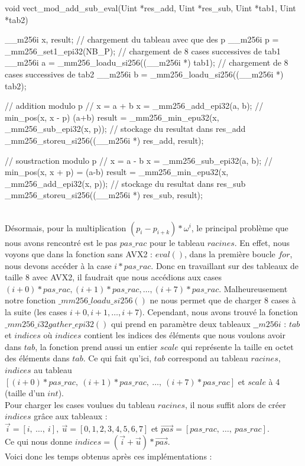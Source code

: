\documentclass[12pt, a4paper]{article}
\begin{document}
\begin{customFrame}
void vect_mod_add_sub_eval(Uint *res_add, Uint *res_sub, Uint *tab1, Uint *tab2) {
    __m256i x, result; 
    // chargement du tableau avec que des p
    __m256i p = _mm256_set1_epi32(NB_P); 
    // chargement de 8 cases successives de tab1
    __m256i a = _mm256_loadu_si256((__m256i *) tab1); 
    // chargement de 8 cases successives de tab2
    __m256i b = _mm256_loadu_si256((__m256i *) tab2); 

    // addition modulo p
    // x = a + b
    x = _mm256_add_epi32(a, b); 
    // min_pos(x, x - p) (a+b)%
    result = _mm256_min_epu32(x, _mm256_sub_epi32(x, p)); 
    // stockage du resultat dans res_add
    _mm256_storeu_si256((__m256i *) res_add, result);

    // soustraction modulo p
    // x = a - b
    x = _mm256_sub_epi32(a, b);
    // min_pos(x, x + p) = (a-b)%
    result = _mm256_min_epu32(x, _mm256_add_epi32(x, p)); 
    // stockage du resultat dans res_sub
    _mm256_storeu_si256((__m256i *) res_sub, result);
}
\end{customFrame}
\ \\
\indent Désormais, pour la multiplication $(p_i-p_{i+k})*\omega^i$, le principal problème que nous avons rencontré est le pas $pas\_rac$ pour le tableau $racines$. En effet, nous voyons que dans la fonction sans AVX2 : $eval()$, dans la première boucle $for$, nous devons accéder à la case $i*pas\_rac$. Donc en travaillant sur des tableaux de taille 8 avec AVX2, il faudrait que nous accédions aux cases $(i+0)*pas\_rac,(i+1)*pas\_rac,\dots,(i+7)*pas\_rac$. 
Malheureusement notre fonction $\_mm256\_loadu\_si256()$ ne nous permet que de charger 8 cases à la suite (les cases $i+0, i+1,\dots,i+7$).
Cependant, nous avons trouvé la fonction $\_mm256\_i32gather\_epi32()$ qui prend en paramètre deux tableaux $\_\_m256i$ : $tab$ et $indices$ où $indices$ contient les indices des éléments que nous voulons avoir dans $tab$, la fonction prend aussi un entier $scale$ qui représente la taille en octet des éléments dans $tab$. Ce qui fait qu'ici, $tab$ correspond au tableau $racines$, $indices$ au tableau $[(i+0)*pas\_rac,\ (i+1)*pas\_rac,\ \dots,\ (i+7)*pas\_rac]$ et $scale$ à 4 (taille d'un $int$).\\
\indent Pour charger les cases voulues du tableau $racines$, il nous suffit alors de créer $indices$ grâce aux tableaux : \\ $\overrightarrow{i} = [i,\ \dots,\ i],\  \overrightarrow{u} = [0, 1, 2, 3, 4, 5, 6, 7]$ et $ \overrightarrow{pas} = [pas\_rac,\ \dots,\ pas\_rac]$. \\
Ce qui nous donne $indices = (\overrightarrow{i}+\overrightarrow{u})*\overrightarrow{pas}$. \\
Voici donc les temps obtenus après ces implémentations :
\end{document}
